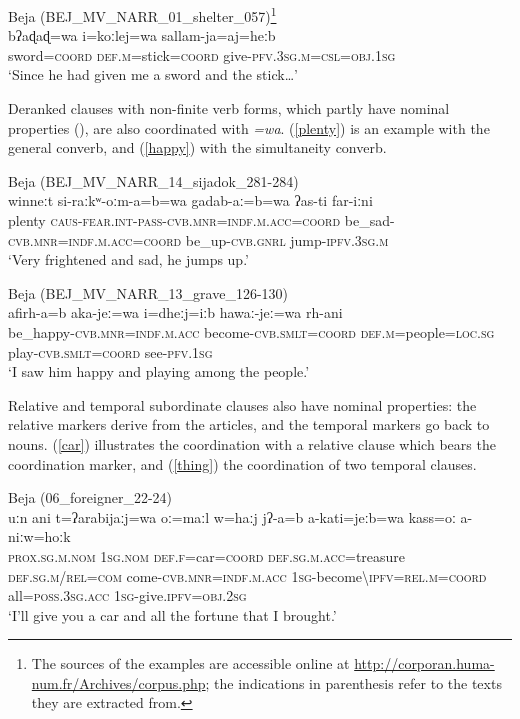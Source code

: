 \documentclass[output=paper]{langsci/langscibook}
\begin{document}
\ea \label{sword}
{Beja (BEJ\_MV\_NARR\_01\_shelter\_057)\footnote{The sources of the examples are accessible online at \url{http://corporan.huma-num.fr/Archives/corpus.php}; the indications in parenthesis refer to the texts they are extracted from.}}\\
\gll bʔaɖaɖ=wa i=koːlej=wa sallam-ja=aj=heːb\\
     sword=\textsc{coord} \textsc{def.m}=stick=\textsc{coord} give-\textsc{pfv.3sg.m=csl=obj.1sg}\\
\glt `Since he had given me a sword and the stick…'
\z

Deranked clauses with non-finite verb forms, which partly have nominal properties (\citealt{Vanhove2016}), are also coordinated with \textit{=wa}. (\ref{plenty}) is an example with the general converb, and (\ref{happy}) with the simultaneity converb. 

\ea\label{plenty}
{Beja (BEJ\_MV\_NARR\_14\_sijadok\_281-284)}\\
\gll winneːt si-raːkʷ-oːm-a=b=wa gadab-aː=b=wa  ʔas-ti far-iːni\\
     plenty \textsc{caus}{}-\textsc{\textup{fear}}.\textsc{int-pass-cvb.mnr=indf.m.acc=coord} be\_sad-\textsc{cvb.mnr=indf.m.acc=coord} be\_up-\textsc{cvb.gnrl} jump-\textsc{ipfv.3sg.m}\\
\glt `Very frightened and sad, he jumps up.'
\z

\ea\label{happy}
{Beja (BEJ\_MV\_NARR\_13\_grave\_126-130)}\\
\gll afirh-a=b aka-jeː=wa i=dheːj=iːb hawaː-jeː=wa rh-ani\\
     be\_happy-\textsc{cvb.mnr=indf.m.acc} become-\textsc{cvb.smlt=coord} \textsc{def.m}=people=\textsc{loc.sg} play-\textsc{cvb.smlt=coord} see-\textsc{pfv.1sg}\\
\glt `I saw him happy and playing among the people.'
\z

{Relative and temporal subordinate clauses also have nominal properties: the relative markers derive from the articles, and the temporal markers go back to nouns. (\ref{car}) illustrates the coordination with a relative clause which bears the} {coordination marker, and (\ref{thing}) the coordination of two temporal clauses.}

\ea\label{car}
{{Beja}{ (}{06\_foreigner\_22-24)}}\\
\gll uːn ani t=ʔarabijaːj=wa oː=maːl w=haːj jʔ-a=b a-kati=jeːb=wa kass=oː  a-niːw=hoːk\\
     \textsc{prox.sg.m.nom}	\textsc{1sg.nom} \textsc{def.f=}car=\textsc{coord} \textsc{def.sg.m.acc=}treasure \textsc{def.sg.m/rel=com} come-\textsc{cvb.mnr=indf.m.acc} \textsc{1sg}-become\textsc{\textbackslash ipfv=rel.m=coord} all=\textsc{poss.3sg.acc} \textsc{1sg}-give.\textsc{ipfv=obj.2sg}\\
\glt `I’ll give you a car and all the fortune that I brought.'
\z
\end{document}
